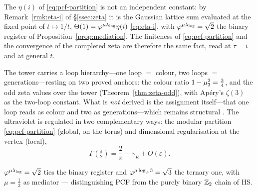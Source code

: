 \begin{remark}\label{rmk:eta-loop}
The $\eta(i)$ of \eqref{eq:pcf-partition} is not an independent constant: by
Remark~\ref{rmk:eta-i} of \S\ref{ssec:zeta} it is the Gaussian lattice sum evaluated at the fixed
point of $t\mapsto1/t$, $\Theta(1)=\varphi^{\mu\lambda_{\log}}\eta(i)$ \eqref{eq:eta-i}, with
$\varphi^{\mu\lambda_{\log}}=\sqrt2$ the binary register of Proposition~\ref{prop:mediation}. The finiteness
of \eqref{eq:pcf-partition} and the convergence of the completed zeta are therefore the same fact,
read at $\tau=i$ and at general $t$.


\end{remark}

The tower carries a loop hierarchy---one loop $=$ colour, two loops $=$ generations---resting on
two proved anchors:
the colour ratio $1-\mu_{3}^{2}=\tfrac34$, and the odd zeta values over the tower
(Theorem~\ref{thm:zeta-odd}), with Ap\'ery's $\zeta(3)$~\cite{Apery} as the two-loop constant.
What is \emph{not} derived is the assignment itself---that one loop reads as colour and two as
generations---which remains structural .
The ultraviolet is regulated in two complementary
ways: the modular partition \eqref{eq:pcf-partition} (global, on the torus) and dimensional
regularisation at the vertex (local),
\begin{equation}\label{eq:gamma-pole}
  \Gamma\!\left(\tfrac{\varepsilon}{2}\right)=\frac{2}{\varepsilon}-\gamma_{E}+O(\varepsilon).
\end{equation}

\begin{remark}
$\varphi^{\mu\lambda_{\log}}=\sqrt2$ ties the binary register and $\varphi^{\mu\log_{\varphi}3}=\sqrt3$ the
ternary one, with $\mu=\tfrac12$ as mediator --- distinguishing PCF from the purely binary $\mathbb{Z}_{2}$
chain of HS.
\end{remark}

